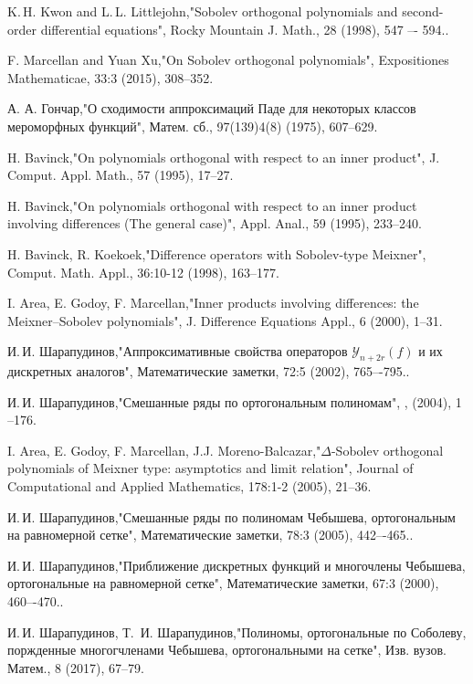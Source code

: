 \begin{thebibliography}{20}
K.\,H. Kwon and L.\,L. Littlejohn,"Sobolev orthogonal polynomials and second-order differential equations", Rocky Mountain J. Math., 28 (1998), 547 –- 594..

F. Marcellan and Yuan Xu,"On Sobolev orthogonal polynomials", Expositiones Mathematicae, 33:3 (2015), 308--352.

А. А. Гончар,"О сходимости аппроксимаций Паде для некоторых классов мероморфных функций", Матем. сб., 97(139)4(8) (1975), 607–629.

H. Bavinck,"On polynomials orthogonal with respect to an inner product", J. Comput. Appl. Math., 57 (1995), 17--27.

H. Bavinck,"On polynomials orthogonal with respect to an inner product involving differences (The general case)", Appl. Anal., 59 (1995), 233--240.

H. Bavinck, R. Koekoek,"Difference operators with Sobolev-type Meixner", Comput. Math. Appl., 36:10-12 (1998), 163--177.

I. Area, E. Godoy, F. Marcellan,"Inner products involving differences: the Meixner--Sobolev polynomials", J. Difference Equations Appl., 6 (2000), 1--31.

И.\,И. Шарапудинов,"Аппроксимативные свойства операторов $\mathcal{Y}_{n+2r}(f)$ и их дискретных аналогов", Математические заметки, 72:5 (2002), 765–-795..

И.\,И. Шарапудинов,"Смешанные ряды по ортогональным полиномам", ,  (2004), 1 --176.

I. Area, E. Godoy, F. Marcellan, J.J. Moreno-Balcazar,"$\Delta$-Sobolev orthogonal polynomials of Meixner type: asymptotics and limit relation", Journal of Computational and Applied Mathematics, 178:1-2 (2005), 21--36.

И.\,И. Шарапудинов,"Смешанные ряды по полиномам Чебышева, ортогональным на равномерной сетке", Математические заметки, 78:3 (2005), 442–-465..

И.\,И. Шарапудинов,"Приближение дискретных функций и многочлены Чебышева, ортогональные на равномерной сетке", Математические заметки, 67:3 (2000), 460–-470..

И.\,И. Шарапудинов, Т.\, И. Шарапудинов,"Полиномы, ортогональные по Соболеву, поржденные многогчленами Чебышева, ортогональными на сетке", Изв. вузов. Матем., 8 (2017), 67--79.


\end{thebibliography}
